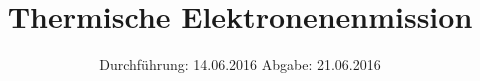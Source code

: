 

\subject{V504}
\title{Thermische Elektronenenmission}
\date{
  Durchführung: 14.06.2016
  \hspace{3em}
  Abgabe: 21.06.2016
}



\maketitle
\thispagestyle{empty}
\tableofcontents
\newpage








\printbibliography


